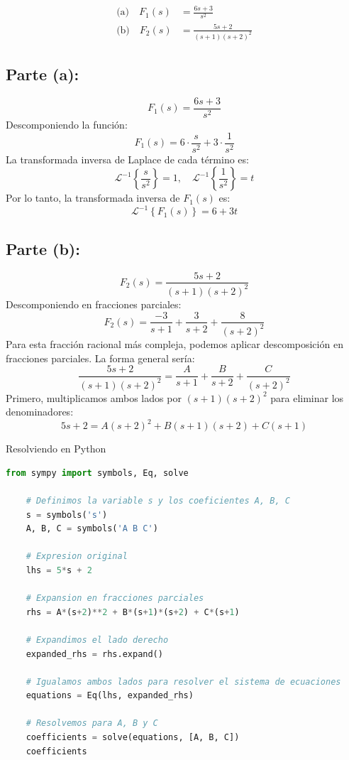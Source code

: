 \documentclass[10pt]{article}
\theoremstyle{definition}
\theoremstyle{remark}
\theoremstyle{definition}
\numberwithin{equation}{prob}
\begin{document}
\begin{equation}
	\begin{aligned}
		\text{(a)} \quad F_1(s) & = \frac{6s + 3}{s^2}              \\
		\text{(b)} \quad F_2(s) & = \frac{5s + 2}{(s + 1)(s + 2)^2}
	\end{aligned}
\end{equation}


\subsection{Parte (a):}
\[
	F_1(s) = \frac{6s + 3}{s^2}
\]
Descomponiendo la función:
\[
	F_1(s) = 6 \cdot \frac{s}{s^2} + 3 \cdot \frac{1}{s^2}
\]
La transformada inversa de Laplace de cada término es:
\[
	\mathcal{L}^{-1}\left\{ \frac{s}{s^2} \right\} = 1, \quad \mathcal{L}^{-1}\left\{ \frac{1}{s^2} \right\} = t
\]
Por lo tanto, la transformada inversa de \( F_1(s) \) es:
\[
	\mathcal{L}^{-1}\left\{ F_1(s) \right\} = 6 + 3t
\]

\subsection{Parte (b):}
\[
	F_2(s) = \frac{5s + 2}{(s+1)(s+2)^2}
\]
Descomponiendo en fracciones parciales:
\[
	F_2(s) = \frac{-3}{s+1} + \frac{3}{s+2} + \frac{8}{(s+2)^2}
\]
Para esta fracción racional más compleja, podemos aplicar descomposición en fracciones parciales. La forma general sería:
\[
	\frac{5s + 2}{(s + 1)(s + 2)^2} = \frac{A}{s+1} + \frac{B}{s+2} + \frac{C}{(s+2)^2}
\]
Primero, multiplicamos ambos lados por \( (s + 1)(s + 2)^2 \) para eliminar los denominadores:
\[
	5s + 2 = A(s + 2)^2 + B(s + 1)(s + 2) + C(s + 1)
\]

Resolviendo en Python
\begin{lstlisting}[language=Python]
    from sympy import symbols, Eq, solve

    # Definimos la variable s y los coeficientes A, B, C
    s = symbols('s')
    A, B, C = symbols('A B C')
    
    # Expresion original
    lhs = 5*s + 2
    
    # Expansion en fracciones parciales
    rhs = A*(s+2)**2 + B*(s+1)*(s+2) + C*(s+1)
    
    # Expandimos el lado derecho
    expanded_rhs = rhs.expand()
    
    # Igualamos ambos lados para resolver el sistema de ecuaciones
    equations = Eq(lhs, expanded_rhs)
    
    # Resolvemos para A, B y C
    coefficients = solve(equations, [A, B, C])
    coefficients
\end{lstlisting}
\end{document}
